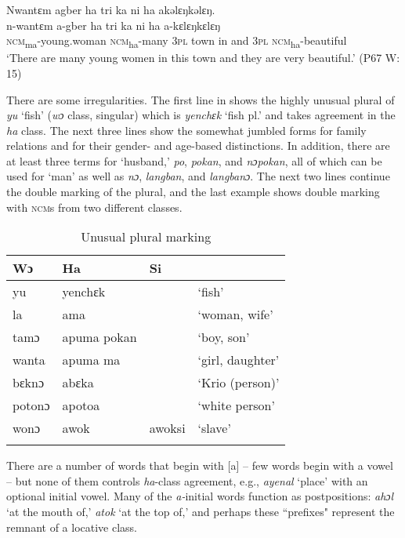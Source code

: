 \ea%
    \label{ex:143}
    Nwantɛm agber ha tri ka ni ha akəlɛŋkəlɛŋ.\\
    \gll n-wantɛm          a-gber      ha    tri    ka    ni    ha    a-kɛlɛŋkɛlɛŋ\\
    \textsc{ncm}\textsubscript{ma}{}-young.woman  \textsc{ncm}\textsubscript{ha}{}-many  \textsc{3pl}  town  in    and  \textsc{3pl}  \textsc{ncm}\textsubscript{ha}{}-beautiful\\
    \glt ‘There are many young women in this town and they are very beautiful.' (P67 W: 15)
\z

There are some irregularities. The first line in  shows the highly unusual plural of \textit{yu} ‘fish' (\textit{wɔ} class, singular) which is \textit{yenchɛk} ‘fish pl.' and takes agreement in the \textit{ha} class. The next three lines show the somewhat jumbled forms for family relations and for their gender- and age-based distinctions. In addition, there are at least three terms for ‘husband,' \textit{po}, \textit{pokan}, and \textit{nɔpokan}, all of which can be used for ‘man' as well as \textit{nɔ}, \textit{langban}, and \textit{langbanɔ}. The next two lines continue the double marking of the plural, and the last example shows double marking with \textsc{ncm}s from two different classes.

\begin{table}
\caption{\label{tab:nounclass:36}Unusual plural marking}

\begin{tabular}{llll}
\lsptoprule
Wɔ & Ha & Si &\\
\midrule
yu & yenchɛk &  & ‘fish'\\
\tablevspace
la & ama &  & ‘woman, wife'\\
tamɔ & apuma pokan &  & ‘boy, son'\\
wanta & apuma ma &  & ‘girl, daughter'\\
\tablevspace
bɛknɔ & abɛka &  & ‘Krio (person)'\\
potonɔ & apotoa &  & ‘white person'\\
\tablevspace
wonɔ & awok & awoksi & ‘slave'\\
\lspbottomrule
\end{tabular}
\end{table}

There are a number of words that begin with [a] – few words begin with a vowel – but none of them controls \textit{ha}{}-class agreement, e.g., \textit{ayenal} ‘place' with an optional initial vowel. Many of the \textit{a-}initial words function as postpositions: \textit{ahɔl} ‘at the mouth of,' \textit{atok} ‘at the top of,' and perhaps these “prefixes" represent the remnant of a locative class.


